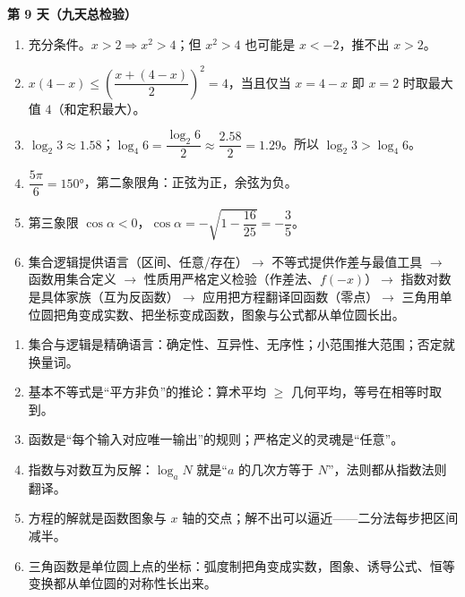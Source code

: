 \documentclass[UTF8,a4paper,11pt]{ctexart}
\begin{document}
\textbf{第 9 天（九天总检验）}
\begin{enumerate}
  \item 充分条件。$x > 2 \Rightarrow x^2 > 4$；但 $x^2 > 4$ 也可能是 $x < -2$，推不出 $x > 2$。
  \item $x(4-x) \leq \left(\dfrac{x + (4-x)}{2}\right)^2 = 4$，当且仅当 $x = 4-x$ 即 $x = 2$ 时取最大值 $4$（和定积最大）。
  \item $\log_2 3 \approx 1.58$；$\log_4 6 = \dfrac{\log_2 6}{2} \approx \dfrac{2.58}{2} = 1.29$。所以 $\log_2 3 > \log_4 6$。
  \item $\dfrac{5\pi}{6} = 150°$，第二象限角：正弦为正，余弦为负。
  \item 第三象限 $\cos\alpha < 0$，$\cos\alpha = -\sqrt{1 - \dfrac{16}{25}} = -\dfrac{3}{5}$。
  \item 集合逻辑提供语言（区间、任意/存在）$\rightarrow$ 不等式提供作差与最值工具 $\rightarrow$ 函数用集合定义 $\rightarrow$ 性质用严格定义检验（作差法、$f(-x)$）$\rightarrow$ 指数对数是具体家族（互为反函数）$\rightarrow$ 应用把方程翻译回函数（零点）$\rightarrow$ 三角用单位圆把角变成实数、把坐标变成函数，图象与公式都从单位圆长出。
\end{enumerate}

\vspace{1em}
\begin{keyconcept}
\begin{enumerate}
  \item 集合与逻辑是精确语言：确定性、互异性、无序性；小范围推大范围；否定就换量词。
  \item 基本不等式是“平方非负”的推论：算术平均 $\geq$ 几何平均，等号在相等时取到。
  \item 函数是“每个输入对应唯一输出”的规则；严格定义的灵魂是“任意”。
  \item 指数与对数互为反解：$\log_a N$ 就是“$a$ 的几次方等于 $N$”，法则都从指数法则翻译。
  \item 方程的解就是函数图象与 $x$ 轴的交点；解不出可以逼近——二分法每步把区间减半。
  \item 三角函数是单位圆上点的坐标：弧度制把角变成实数，图象、诱导公式、恒等变换都从单位圆的对称性长出来。
\end{enumerate}
\end{keyconcept}
\end{document}
